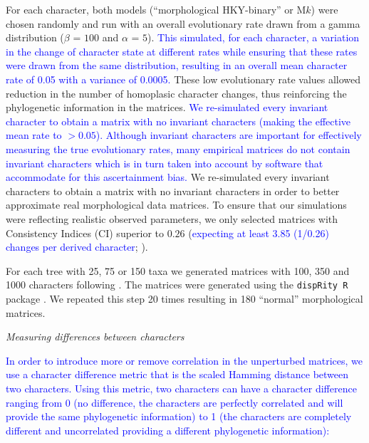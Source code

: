 \documentclass[12pt,letterpaper]{article}
\renewcommand{\subsection}[1]{%
\bigskip
\begin{center}
\begin{large}
\normalfont\itshape #1
\end{large}
\end{center}}
\begin{document}
\noindent For each character, both models (``morphological HKY-binary'' or M$k$) were chosen randomly and run with an overall evolutionary rate drawn from a gamma distribution ($\beta$ = $100$ and $\alpha$ = $5$).
\textcolor{blue}{This simulated, for each character, a variation in the change of character state at different rates while ensuring that these rates were drawn from the same distribution, resulting in an overall mean character rate of 0.05 with a variance of 0.0005.}
These low evolutionary rate values allowed reduction in the number of homoplasic character changes, thus reinforcing the phylogenetic information in the matrices.
\textcolor{blue}{We re-simulated every invariant character to obtain a matrix with no invariant characters (making the effective mean rate to $>0.05$).
Although invariant characters are important for effectively measuring the true evolutionary rates, many empirical matrices do not contain invariant characters which is in turn taken into account by software that accommodate for this ascertainment bias.}
We re-simulated every invariant characters to obtain a matrix with no invariant characters in order to better approximate real morphological data matrices.
To ensure that our simulations were reflecting realistic observed parameters, we only selected matrices with Consistency Indices (CI) superior to $0.26$ (\textcolor{blue}{expecting at least 3.85 (1/0.26) changes per derived character}; \citealt{sanderson1989patterns,OReilly20160081}).

For each tree with 25, 75 or 150 taxa we generated matrices with 100, 350 and 1000 characters following \cite{OReilly20160081}.
The matrices were generated using the \texttt{dispRity R} package \citep{thomas_guillerme_2016_55646}.
We repeated this step 20 times resulting in 180 ``normal'' morphological matrices.

\subsection{Measuring differences between characters}

\label{CDdescription}

\textcolor{blue}{In order to introduce more or remove correlation in the unperturbed matrices, we use a character difference metric that is the scaled Hamming distance between two characters.
Using this metric, two characters can have a character difference ranging from 0 (no difference, the characters are perfectly correlated and will provide the same phylogenetic information) to 1 (the characters are completely different and uncorrelated providing a different phylogenetic information):}
\end{document}
